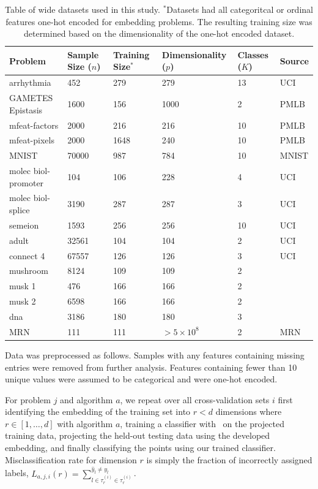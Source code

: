 \documentclass[11pt]{extarticle}
\begin{document}
\begin{table}[]
    \centering
    \begin{tabular}{| l | l | l | l | l | l | }
        \hline
        Problem & Sample Size ($n$) & Training Size$^*$ & Dimensionality ($p$) & Classes ($K$) & Source \\
        \hline
        arrhythmia & 452 & 279 & 279 & 13 & UCI \cite{uci} \\
        GAMETES Epistasis & 1600 & 156 & 1000 & 2 & PMLB \cite{Olson2017} \\
        mfeat-factors & 2000 & 216 & 216 & 10 & PMLB \cite{Olson2017} \\
        mfeat-pixels & 2000 & 1648 & 240 & 10 & PMLB \cite{Olson2017} \\
        MNIST & 70000 & 987 & 784 & 10 & MNIST \cite{mnist} \\
        molec biol-promoter & 104 & 106 & 228 & 4 & UCI \cite{uci} \\
        molec biol-splice & 3190 & 287 & 287 & 3 & UCI \cite{uci} \\
        semeion & 1593 & 256 & 256 & 10 & UCI \cite{uci} \\
        adult & 32561 & 104 & 104 & 2 & UCI \cite{uci} \\
        connect 4 & 67557 & 126 & 126 & 3 & UCI \cite{uci} \\
        mushroom & 8124 & 109 & 109 & 2 & \cite{uci} \\
        musk 1 & 476 & 166 & 166 & 2 & \cite{uci} \\
        musk 2 & 6598 & 166 & 166 & 2 & \cite{uci} \\
        dna & 3186 & 180 & 180 & 3 & \cite{uci} \\
        MRN & 111  & 111 & $>5 \times 10^8$ & 2 & MRN \\
        \hline
    \end{tabular}
    \caption{Table of wide datasets used in this study. $^*$Datasets had all categoritcal or ordinal features one-hot encoded for embedding problems. The resulting training size was determined based on the dimensionality of the one-hot encoded dataset.}
\label{tab:realdata}
\end{table}


Data was preprocessed as follows. Samples with any features containing missing entries were removed from further analysis. Features containing fewer than 10 unique values were assumed to be categorical and were one-hot encoded.

For problem $j$ and algorithm $a$, we repeat over all cross-validation sets $i$ first identifying the embedding of the training set into $r < d$ dimensions where $r \in [1, \hdots, d]$ with algorithm $a$, training a classifier with \Lda~on the projected training data, projecting the held-out testing data using the developed embedding, and finally classifying the points using our trained classifier. Misclassification rate for dimension $r$ is simply the fraction of incorrectly assigned labels, $L_{a, j, i}(r) = \sum_{l \in \tau_r^{(i)} \in \tau_r^{(i)}}^{\hat{y}_l \neq y_l}$.
\end{document}
